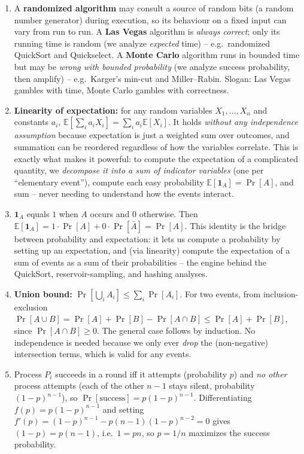 \documentclass[11pt]{article}
\begin{document}
\begin{enumerate}[label=\textbf{A\arabic*.}, leftmargin=2.2em]

\item A \textbf{randomized algorithm} may consult a source of random bits (a random number
generator) during execution, so its behaviour on a fixed input can vary from run to run. A
\textbf{Las Vegas} algorithm is \emph{always correct}; only its running time is random (we
analyze \emph{expected} time) -- e.g.\ randomized QuickSort and Quickselect. A
\textbf{Monte Carlo} algorithm runs in bounded time but may be \emph{wrong with bounded
probability} (we analyze success probability, then amplify) -- e.g.\ Karger's min-cut and
Miller--Rabin. Slogan: Las Vegas gambles with time, Monte Carlo gambles with correctness.

\item \textbf{Linearity of expectation:} for any random variables $X_1,\ldots,X_n$ and
constants $a_i$, $\mathbb{E}[\sum_i a_i X_i] = \sum_i a_i \mathbb{E}[X_i]$. It holds
\emph{without any independence assumption} because expectation is just a weighted sum over
outcomes, and summation can be reordered regardless of how the variables correlate. This is
exactly what makes it powerful: to compute the expectation of a complicated quantity, we
\emph{decompose it into a sum of indicator variables} (one per ``elementary event''),
compute each easy probability $\mathbb{E}[\mathbf{1}_A] = \Pr[A]$, and sum -- never needing
to understand how the events interact.

\item $\mathbf{1}_A$ equals $1$ when $A$ occurs and $0$ otherwise. Then $\mathbb{E}[
\mathbf{1}_A] = 1\cdot\Pr[A] + 0\cdot\Pr[\bar A] = \Pr[A]$. This identity is the bridge
between probability and expectation: it lets us compute a probability by setting up an
expectation, and (via linearity) compute the expectation of a sum of events as a sum of
their probabilities -- the engine behind the QuickSort, reservoir-sampling, and hashing
analyses.

\item \textbf{Union bound:} $\Pr[\bigcup_i A_i] \le \sum_i \Pr[A_i]$. For two events, from
inclusion-exclusion $\Pr[A\cup B] = \Pr[A] + \Pr[B] - \Pr[A\cap B] \le \Pr[A] + \Pr[B]$,
since $\Pr[A\cap B]\ge 0$. The general case follows by induction. No independence is needed
because we only ever \emph{drop} the (non-negative) intersection terms, which is valid for
any events.

\item Process $P_i$ succeeds in a round iff it attempts (probability $p$) and \emph{no
other} process attempts (each of the other $n-1$ stays silent, probability $(1-p)^{n-1}$),
so $\Pr[\text{success}] = p(1-p)^{n-1}$. Differentiating $f(p) = p(1-p)^{n-1}$ and setting
$f'(p) = (1-p)^{n-1} - p(n-1)(1-p)^{n-2} = 0$ gives $(1-p) = p(n-1)$, i.e.\ $1 = pn$, so
$p = 1/n$ maximizes the success probability.


\end{enumerate}
\end{document}
